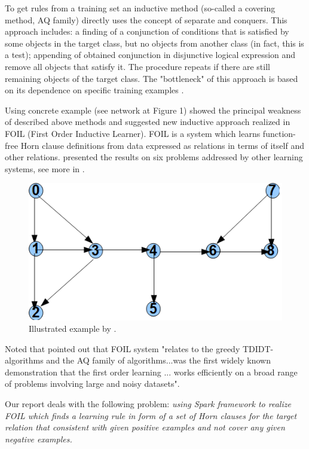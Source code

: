 \documentclass{scrartcl}
\begin{document}
To get rules from a training set an inductive method (so-called a covering method, AQ family) directly uses the concept of separate and conquers. This approach includes: a finding of a conjunction of conditions that is satisfied by some objects in the target class, but no objects from another class (in fact, this is a test); appending of obtained conjunction in disjunctive logical expression and remove all objects that satisfy it. The procedure repeats if there are still remaining objects of the target class. The \textrm{"}bottleneck\textrm{"} of this approach is based on its dependence on specific training examples \citep{Quinlan1990}.

Using concrete example (see network at Figure 1) \citet{Quinlan1990}  showed the principal weakness of described above methods and suggested  new inductive approach realized in FOIL (First Order Inductive Learner).
FOIL  is a system which learns function-free Horn clause definitions from data expressed as relations in terms of itself and other relations. \citet{Quinlan1990} presented the results on six problems addressed by other learning systems, see more in \citep{Quinlan1993, Quinlan1995}.
\begin{figure}[h!] \centering
\includegraphics[bb =0 0 481 260,scale =0.3]{foil1.png}
\caption{Illustrated example by \citet{Quinlan1990}.}
\end{figure}
Noted that \citet{Muggleton1994} pointed out that FOIL system \textrm{"}relates to the greedy TDIDT-algorithms and the AQ family of algorithms...was the first widely known demonstration that the first order learning ... works efficiently on a broad range of problems involving large and noisy datasets\textrm{"}.

Our report deals with the following problem: \emph{using Spark framework to realize FOIL
which finds a learning rule in form of
 a set of Horn clauses for the target relation that consistent
 with given positive examples and not cover any given negative examples.}
\end{document}
